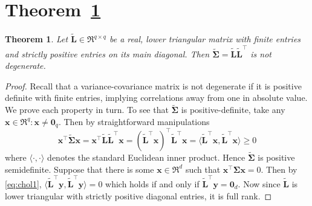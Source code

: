 \documentclass[11pt, a4paper]{article}
\newcommand*{\bb}{\boldsymbol}
\theoremstyle{example} \newtheorem{example}{Example}[section]
\theoremstyle{theorem} \newtheorem{theorem}{Theorem}[section]
\begin{document}
\section{Theorem~\ref{thm:nondeg}}

\begin{theorem}
  \label{thm:nondeg}
  Let $\tilde{\bb L} \in \Re^{q \times q}$ be a real, lower triangular matrix with finite entries and strictly positive entries on its main diagonal. Then $\tilde{\bb \Sigma} = \tilde{\bb L}\tilde{\bb L}^\top$ is not degenerate. 
\end{theorem}
\begin{proof}
	Recall that a variance-covariance matrix is not degenerate if it is positive definite with finite entries, implying correlations away from one in absolute value. We prove each property in turn. To see that $\tilde{\bb \Sigma}$ is positive-definite, take any $\bb x\in \Re^q:\bb x\neq \bb 0_q$. Then by straightforward manipulations 
        \begin{equation}
          \label{eq:chol1}
        \bb x^\top\tilde{\bb \Sigma}\bb x = \bb x^\top\tilde{\bb L}\tilde{\bb L}^\top\bb x
	= (\tilde{\bb L}^\top\bb x)^\top\tilde{\bb L}^\top\bb x 
	= \langle \tilde{\bb L}^\top\bb x, \tilde{\bb L}^\top\bb x\rangle \geq 0
      \end{equation}
      where $\langle\cdot,\cdot\rangle$ denotes the standard Euclidean inner product. Hence $\tilde{\bb \Sigma}$ is positive semidefinite. Suppose that there is some $\bb x \in \Re^d$ such that $\bb x^\top \bb \Sigma \bb x=0$. Then by \eqref{eq:chol1}, $\langle \tilde{\bb L}^\top\bb y, \tilde{\bb L}^\top\bb y \rangle = 0$ which holds if and only if $\tilde{\bb L}^\top\bb y=\bb 0_d$. Now since $\tilde{\bb L}$ is lower triangular with strictly positive diagonal entries, it is full rank. %

\end{proof}
\end{document}

